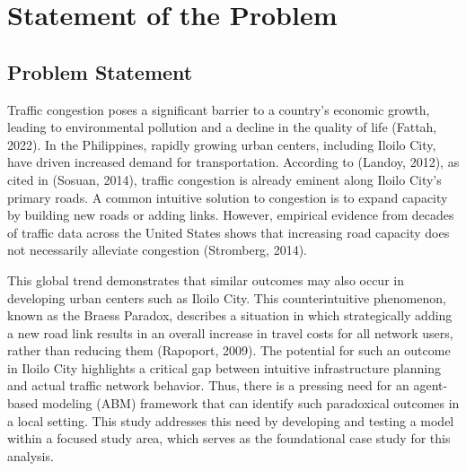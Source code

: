 \chapter{Statement of the Problem}
\label{chap:problem_statement}

\section{Problem Statement}
\label{sec:problem_statement}

Traffic congestion poses a significant barrier to a country's economic growth, leading to environmental pollution and a decline in the quality of life (Fattah, 2022). In the Philippines, rapidly growing urban centers, including Iloilo City, have driven increased demand for transportation. According to (Landoy, 2012), as cited in (Sosuan, 2014), traffic congestion is already eminent along Iloilo City's primary roads. A common intuitive solution to congestion is to expand capacity by building new roads or adding links. However, empirical evidence from decades of traffic data across the United States shows that increasing road capacity does not necessarily alleviate congestion (Stromberg, 2014). 

This global trend demonstrates that similar outcomes may also occur in developing urban centers such as Iloilo City. This counterintuitive phenomenon, known as the Braess Paradox, describes a situation in which strategically adding a new road link results in an overall increase in travel costs for all network users, rather than reducing them (Rapoport, 2009). The potential for such an outcome in Iloilo City highlights a critical gap between intuitive infrastructure planning and actual traffic network behavior. Thus, there is a pressing need for an agent-based modeling (ABM) framework that can identify such paradoxical outcomes in a local setting. This study addresses this need by developing and testing a model within a focused study area, which serves as the foundational case study for this analysis.